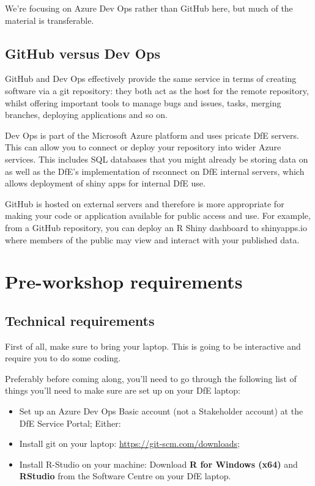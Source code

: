\documentclass[
  12pt,
]{article}
\begin{document}
We're focusing on Azure Dev Ops rather than GitHub here, but much of the
material is transferable.

\hypertarget{github-versus-dev-ops}{%
\subsection{GitHub versus Dev Ops}\label{github-versus-dev-ops}}

GitHub and Dev Ops effectively provide the same service in terms of
creating software via a git repository: they both act as the host for
the remote repository, whilst offering important tools to manage bugs
and issues, tasks, merging branches, deploying applications and so on.

Dev Ops is part of the Microsoft Azure platform and uses pricate DfE
servers. This can allow you to connect or deploy your repository into
wider Azure services. This includes SQL databases that you might already
be storing data on as well as the DfE's implementation of rsconnect on
DfE internal servers, which allows deployment of shiny apps for internal
DfE use.

GitHub is hosted on external servers and therefore is more appropriate
for making your code or application available for public access and use.
For example, from a GitHub repository, you can deploy an R Shiny
dashboard to shinyapps.io where members of the public may view and
interact with your published data.

\hypertarget{pre-workshop-requirements}{%
\section{Pre-workshop requirements}\label{pre-workshop-requirements}}

\hypertarget{technical-requirements}{%
\subsection{Technical requirements}\label{technical-requirements}}

First of all, make sure to bring your laptop. This is going to be
interactive and require you to do some coding.

Preferably before coming along, you'll need to go through the following
list of things you'll need to make sure are set up on your DfE laptop:

\begin{itemize}
\item
  Set up an Azure Dev Ops Basic account (not a Stakeholder account) at
  the DfE Service Portal; Either:
\item
  Install git on your laptop: \url{https://git-scm.com/downloads};
\item
  Install R-Studio on your machine: Download \textbf{R for Windows
  (x64)} and \textbf{RStudio} from the Software Centre on your DfE
  laptop.
\end{itemize}
\end{document}
